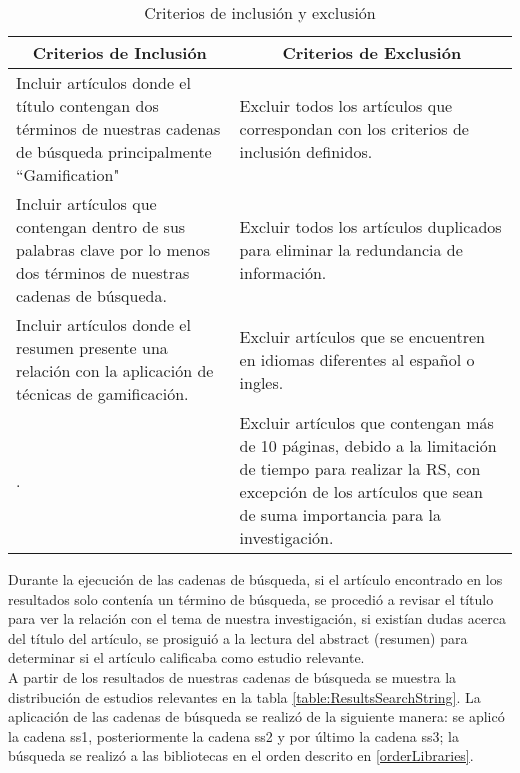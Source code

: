 \documentclass[fleqn,10pt]{SelfArx} %
\begin{document}
\begin{table}
    \begin{center}
        \caption{Criterios de inclusión y exclusión}
        \label{table:criterios}
        \begin{tabular}{| p{3.8cm} | p{3.8cm} |}
            \toprule
            \hline
            \multicolumn{1}{|c|}{\textbf{Criterios de Inclusión}} & \multicolumn{1}{|c|}{\textbf{Criterios de Exclusión}} \\
            \hline
            Incluir artículos donde el título contengan dos términos de nuestras cadenas de búsqueda principalmente ``Gamification"{ }& Excluir todos los artículos que correspondan con los criterios de inclusión definidos.\\
            \hline
            Incluir artículos que contengan dentro de sus palabras clave por lo menos dos términos de nuestras cadenas de búsqueda. & Excluir todos los artículos duplicados para eliminar la redundancia de información.\\
            \hline
            Incluir artículos donde el resumen presente una relación con la aplicación de técnicas de gamificación. & Excluir artículos que se encuentren en idiomas diferentes al español o ingles.\\
            \hline
            . & Excluir artículos que contengan más de 10 páginas, debido a la limitación de tiempo para realizar la RS, con excepción de los artículos que sean de suma importancia para la investigación.\\
            \hline
        \end{tabular}
    \end{center}
\end{table}

    Durante la ejecución de las cadenas de búsqueda, si el artículo encontrado en los resultados solo contenía un término de búsqueda, se procedió a revisar el título para ver la relación con el tema de nuestra investigación, si existían dudas acerca del título del artículo, se prosiguió a la lectura del abstract (resumen) para determinar si el artículo calificaba como estudio relevante. 
    \\
    A partir de los resultados de nuestras cadenas de búsqueda se muestra la distribución de estudios relevantes en la tabla \ref{table:ResultsSearchString}. La aplicación de las cadenas de búsqueda se realizó de la siguiente manera: se aplicó la cadena ss1, posteriormente la cadena ss2 y por último la cadena ss3; la búsqueda se realizó a las bibliotecas en el orden descrito en \ref{orderLibraries}.
    
\end{document}

